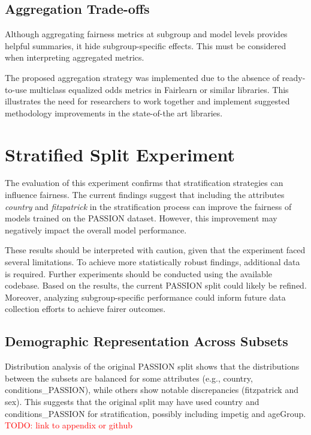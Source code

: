 \documentclass[12pt, a4paper, oneside]{book}   	%
\renewcommand{\todo}[1]{\textcolor{red}{TODO: #1}}
\begin{document}
		\subsection{Aggregation Trade-offs}
		Although aggregating fairness metrics at subgroup and model levels provides helpful summaries, it hide subgroup-specific effects. This must be considered when interpreting aggregated metrics.
		
		The proposed aggregation strategy was implemented due to the absence of ready-to-use multiclass equalized odds metrics in \gls{Fairlearn} or similar libraries. This illustrates the need for researchers to work together and implement suggested methodology improvements in the state-of-the art libraries.
		
		\section{Stratified Split Experiment}
		
		The evaluation of this experiment confirms that stratification strategies can influence fairness. The current findings suggest that including the attributes \textit{country} and \textit{fitzpatrick} in the stratification process can improve the fairness of models trained on the PASSION dataset. However, this improvement may negatively impact the overall model performance.
		
		These results should be interpreted with caution, given that the experiment faced several limitations. To achieve more statistically robust findings, additional data is required. Further experiments should be conducted using the available codebase. Based on the results, the current PASSION split could likely be refined. Moreover, analyzing subgroup-specific performance could inform future data collection efforts to achieve fairer outcomes.
		
		
		\subsection{Demographic Representation Across Subsets}
		Distribution analysis of the original PASSION split shows that the distributions between the subsets are balanced for some attributes (e.g., country, conditions\_PASSION), while others show notable discrepancies (fitzpatrick and sex). This suggests that the original split may have used country and conditions\_PASSION for stratification, possibly including impetig and ageGroup.
		\todo{link to appendix or github} 	%
		
\end{document}
